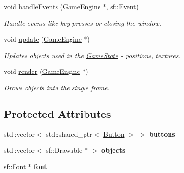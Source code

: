 \begin{DoxyCompactItemize}
void \mbox{\hyperlink{class_base_menu_state_af593c53bcd111bd210b933ddb360f509}{handle\+Events}} (\mbox{\hyperlink{class_game_engine}{Game\+Engine}} $\ast$, sf\+::\+Event)
\begin{DoxyCompactList}\small\item\em Handle events like key presses or closing the window. \end{DoxyCompactList}\item 
\mbox{\label{class_base_menu_state_abfc8c5d2c7c3811443fc79a107a5936e}} 
void \mbox{\hyperlink{class_base_menu_state_abfc8c5d2c7c3811443fc79a107a5936e}{update}} (\mbox{\hyperlink{class_game_engine}{Game\+Engine}} $\ast$)
\begin{DoxyCompactList}\small\item\em Updates objects used in the \mbox{\hyperlink{class_game_state}{Game\+State}} -\/ positions, textures. \end{DoxyCompactList}\item 
\mbox{\label{class_base_menu_state_a404076aa3e789fa75ba1bfe7752c1e18}} 
void \mbox{\hyperlink{class_base_menu_state_a404076aa3e789fa75ba1bfe7752c1e18}{render}} (\mbox{\hyperlink{class_game_engine}{Game\+Engine}} $\ast$)
\begin{DoxyCompactList}\small\item\em Draws objects into the single frame. \end{DoxyCompactList}\end{DoxyCompactItemize}
\subsection*{Protected Attributes}
\begin{DoxyCompactItemize}
\item 
\mbox{\label{class_base_menu_state_ab63cc442453d06b70372d627ceaf8a8e}} 
std\+::vector$<$ std\+::shared\+\_\+ptr$<$ \mbox{\hyperlink{class_button}{Button}} $>$ $>$ {\bfseries buttons}
\item 
\mbox{\label{class_base_menu_state_a59278b3c16e953a01ad350b179024778}} 
std\+::vector$<$ sf\+::\+Drawable $\ast$ $>$ {\bfseries objects}
\item 
\mbox{\label{class_base_menu_state_a2759c3ca4cfd0f34175846e295e0f4e9}} 
sf\+::\+Font $\ast$ {\bfseries font}
\end{DoxyCompactItemize}
